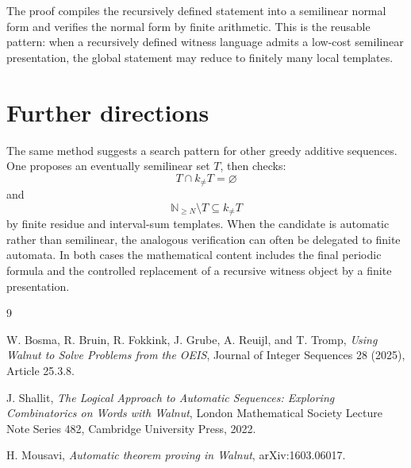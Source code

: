 \documentclass[11pt]{article}
\begin{document}
The proof compiles the recursively defined statement into a semilinear normal form and verifies the normal form by finite arithmetic. This is the reusable pattern: when a recursively defined witness language admits a low-cost semilinear presentation, the global statement may reduce to finitely many local templates.

\section{Further directions}

The same method suggests a search pattern for other greedy additive sequences. One proposes an eventually semilinear set \(T\), then checks:
\[
T\cap k_{\neq}T=\varnothing
\]
and
\[
\mathbb N_{\geq N}\setminus T\subseteq k_{\neq}T
\]
by finite residue and interval-sum templates. When the candidate is automatic rather than semilinear, the analogous verification can often be delegated to finite automata. In both cases the mathematical content includes the final periodic formula and the controlled replacement of a recursive witness object by a finite presentation.

\begin{thebibliography}{9}

W. Bosma, R. Bruin, R. Fokkink, J. Grube, A. Reuijl, and T. Tromp,
\emph{Using Walnut to Solve Problems from the OEIS},
Journal of Integer Sequences 28 (2025), Article 25.3.8.

J. Shallit,
\emph{The Logical Approach to Automatic Sequences: Exploring Combinatorics on Words with Walnut},
London Mathematical Society Lecture Note Series 482, Cambridge University Press, 2022.

H. Mousavi,
\emph{Automatic theorem proving in Walnut},
arXiv:1603.06017.

\end{thebibliography}
\end{document}
